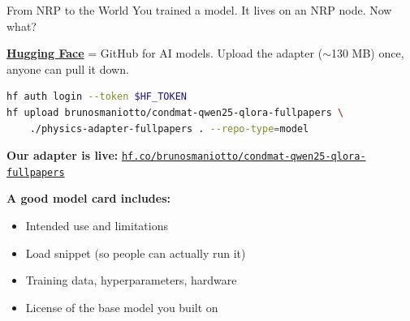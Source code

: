 \documentclass[aspectratio=169]{beamer}
\begin{document}
\begin{frame}[fragile]{From NRP to the World}
    You trained a model. It lives on an NRP node. Now what?

    \vspace{0.6em}
    \textbf{\href{https://huggingface.co}{Hugging Face}} = GitHub for AI models. Upload the adapter ($\sim$130 MB) once, anyone can pull it down.

    \vspace{0.5em}
    \begin{lstlisting}[language=bash]
hf auth login --token $HF_TOKEN
hf upload brunosmaniotto/condmat-qwen25-qlora-fullpapers \
    ./physics-adapter-fullpapers . --repo-type=model
    \end{lstlisting}

    \vspace{0.4em}
    \textbf{Our adapter is live:} \href{https://huggingface.co/brunosmaniotto/condmat-qwen25-qlora-fullpapers}{\texttt{hf.co/brunosmaniotto/condmat-qwen25-qlora-fullpapers}}

    \vspace{0.6em}
    \textbf{A good model card includes:}
    \begin{itemize}
        \item Intended use and limitations
        \item Load snippet (so people can actually run it)
        \item Training data, hyperparameters, hardware
        \item License of the base model you built on
    \end{itemize}
\end{frame}
\end{document}
